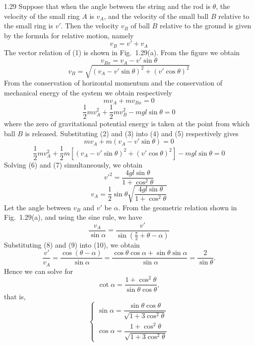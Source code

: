 \begin{solution}{1.29}
Suppose that when the angle between the string and the rod is $\theta$, the velocity of the small ring $A$ is $v_A$, and the velocity of the small ball $B$ relative to the small ring is $v'$. Then the velocity $v_B$ of ball $B$ relative to the ground is given by the formula for relative motion, namely
\begin{equation}
v_B=v'+v_A \tag{1}
\end{equation}
The vector relation of (1) is shown in Fig.~1.29(a). From the figure we obtain
\begin{equation}
v_{Bx}=v_A-v'\sin\theta \tag{2}
\end{equation}
\begin{equation}
v_B=\sqrt{(v_A-v'\sin\theta)^2+(v'\cos\theta)^2} \tag{3}
\end{equation}
From the conservation of horizontal momentum and the conservation of mechanical energy of the system we obtain respectively
\begin{equation}
mv_A+mv_{Bx}=0 \tag{4}
\end{equation}
\begin{equation}
\frac{1}{2}mv_A^2+\frac{1}{2}mv_B^2-mgl\sin\theta=0 \tag{5}
\end{equation}
where the zero of gravitational potential energy is taken at the point from which ball $B$ is released. Substituting (2) and (3) into (4) and (5) respectively gives
\begin{equation}
mv_A+m(v_A-v'\sin\theta)=0 \tag{6}
\end{equation}
\begin{equation}
\frac{1}{2}mv_A^2+\frac{1}{2}m\left[(v_A-v'\sin\theta)^2+(v'\cos\theta)^2\right]-mgl\sin\theta=0 \tag{7}
\end{equation}
Solving (6) and (7) simultaneously, we obtain
\begin{equation}
v'^2=\frac{4gl\sin\theta}{1+\cos^2\theta} \tag{8}
\end{equation}
\begin{equation}
v_A=\frac{1}{2}\sin\theta\sqrt{\frac{4gl\sin\theta}{1+\cos^2\theta}} \tag{9}
\end{equation}
Let the angle between $v_B$ and $v'$ be $\alpha$. From the geometric relation shown in Fig.~1.29(a), and using the sine rule, we have
\begin{equation}
\frac{v_A}{\sin\alpha}=\frac{v'}{\sin\left(\frac{\pi}{2}+\theta-\alpha\right)} \tag{10}
\end{equation}
Substituting (8) and (9) into (10), we obtain
\[
\frac{v'}{v_A}=\frac{\cos(\theta-\alpha)}{\sin\alpha}
=\frac{\cos\theta\cos\alpha+\sin\theta\sin\alpha}{\sin\alpha}
=\frac{2}{\sin\theta}.
\]
Hence we can solve for
\[
\cot\alpha=\frac{1+\cos^2\theta}{\sin\theta\cos\theta},
\]
that is,
\begin{equation}
\begin{cases}
\sin\alpha=\dfrac{\sin\theta\cos\theta}{\sqrt{1+3\cos^2\theta}}\\[2ex]
\cos\alpha=\dfrac{1+\cos^2\theta}{\sqrt{1+3\cos^2\theta}}
\end{cases} \tag{11}
\end{equation}


\end{solution}
